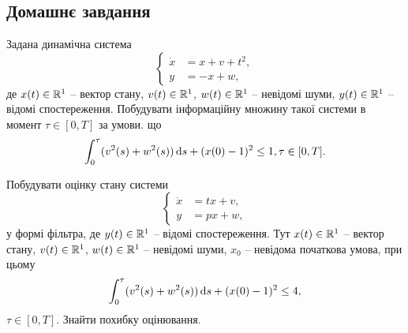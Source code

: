 \subsection*{Домашнє завдання}

\begin{problem}
    Задана динамічна система
    \[ \left\{ \begin{aligned}
        \dot x &= x + v + t^2, \\
        y &= -x + w,
    \end{aligned} \right. \]
    де $x(t) \in \mathbb{R}^1$ -- вектор стану, $v(t)\in\mathbb{R}^1$, $w(t)\in\mathbb{R}^1$ -- невідомі шуми, $y(t)\in\mathbb{R}^1$ -- відомі спостереження. Побудувати інформаційну множину такої системи в момент $\tau\in[0, T]$ за умови. що 
    \[ \int_0^\tau (v^2(s) + w^2(s)) \mathop{}\!\mathrm{d} s + (x(0) - 1)^2 \le 1, \tau \in [0, T]. \]
\end{problem}

\begin{solution}
\end{solution}

\begin{problem}
    Побудувати оцінку стану системи
    \[ \left\{ \begin{aligned}
        \dot x &= tx + v, \\
        y &= px + w,
    \end{aligned} \right. \]
    у формі фільтра, де $y(t)\in\mathbb{R}^1$ -- відомі спостереження. Тут $x(t) \in \mathbb{R}^1$ -- вектор стану, $v(t)\in\mathbb{R}^1$, $w(t)\in\mathbb{R}^1$ -- невідомі шуми, $x_0$ -- невідома початкова умова, при цьому
    \[ \int_0^\tau (v^2(s) + w^2(s)) \mathop{}\!\mathrm{d} s + (x(0) - 1)^2 \le 4, \]
    $\tau \in [0, T]$. Знайти похибку оцінювання.
\end{problem}

\begin{solution}
\end{solution}

\begin{problem}
\end{problem}

\begin{solution}
\end{solution}
